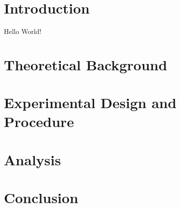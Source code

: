 \documentclass{article}
\title{Experiment #20 - NMR}
\author{Mikhail Roslikov \and Kamalesh Paluru}
\date{\today}
\begin{document}
\maketitle

\begin{abstract}
\end{abstract}

\section{Introduction}
Hello World!
\section{Theoretical Background}

\section{Experimental Design and Procedure}

\section{Analysis}

\section{Conclusion}
\end{document}
